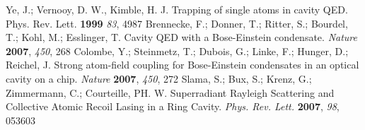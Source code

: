 \documentclass[atoms,article,submit,moreauthors,dvi2pdf,12pt,a4paper]{mdpi}
\begin{document}
\begin{thebibliography}{999}

Ye, J.; Vernooy, D. W., Kimble, H. J. Trapping of single atoms in cavity QED. {\rm Phys. Rev. Lett.} {\bf 1999} {\em 83}, 4987
Brennecke, F.; Donner, T.; Ritter, S.; Bourdel, T.; Kohl, M.; Esslinger, T. Cavity QED with a Bose-Einstein condensate. {\em Nature} {\bf 2007}, {\em 450}, 268
Colombe, Y.; Steinmetz, T.; Dubois, G.; Linke, F.; Hunger, D.; Reichel, J. Strong atom-field coupling for Bose-Einstein condensates in an optical cavity on a chip. {\em Nature} {\bf 2007}, {\em 450}, 272
Slama, S.; Bux, S.; Krenz, G.; Zimmermann, C.; Courteille, PH. W. Superradiant Rayleigh Scattering and Collective Atomic Recoil Lasing in a Ring Cavity. {\em Phys. Rev. Lett.} {\bf 2007}, {\em 98}, 053603

\end{thebibliography}
\end{document}
